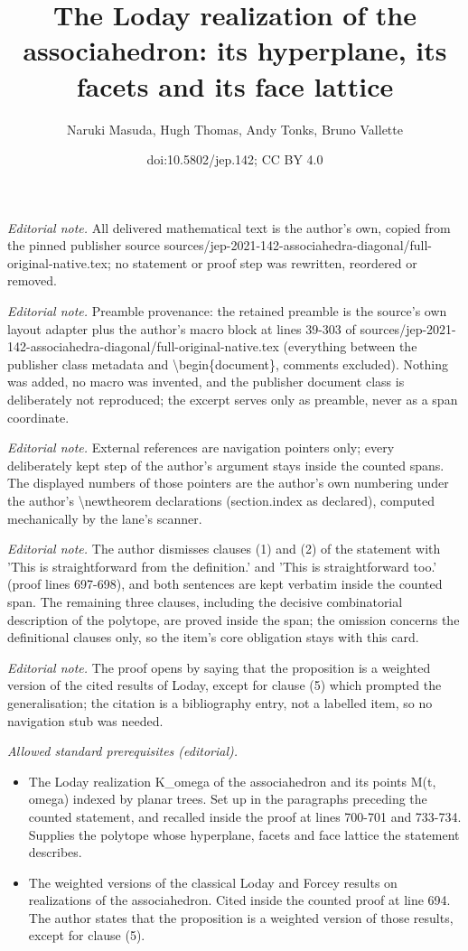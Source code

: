 \documentclass[10pt,a4paper]{amsart}
\title{The Loday realization of the associahedron: its hyperplane, its facets and its face lattice}
\author{Naruki Masuda, Hugh Thomas, Andy Tonks, Bruno Vallette}
\date{doi:10.5802/jep.142; CC BY 4.0}
\numberwithin{equation}{section}\providecommand{\No}{}
\theoremstyle{plain}
\theoremstyle{definition}
\begin{document}
\maketitle
\noindent\textit{Editorial note.} All delivered mathematical text is the author's own, copied from the pinned publisher source sources/jep-2021-142-associahedra-diagonal/full-original-native.tex; no statement or proof step was rewritten, reordered or removed.\par\medskip
\noindent\textit{Editorial note.} Preamble provenance: the retained preamble is the source's own layout adapter plus the author's macro block at lines 39-303 of sources/jep-2021-142-associahedra-diagonal/full-original-native.tex (everything between the publisher class metadata and \textbackslash{}begin\{document\}, comments excluded). Nothing was added, no macro was invented, and the publisher document class is deliberately not reproduced; the excerpt serves only as preamble, never as a span coordinate.\par\medskip
\noindent\textit{Editorial note.} External references are navigation pointers only; every deliberately kept step of the author's argument stays inside the counted spans. The displayed numbers of those pointers are the author's own numbering under the author's \textbackslash{}newtheorem declarations (section.index as declared), computed mechanically by the lane's scanner.\par\medskip
\noindent\textit{Editorial note.} The author dismisses clauses (1) and (2) of the statement with 'This is straightforward from the definition.' and 'This is straightforward too.' (proof lines 697-698), and both sentences are kept verbatim inside the counted span. The remaining three clauses, including the decisive combinatorial description of the polytope, are proved inside the span; the omission concerns the definitional clauses only, so the item's core obligation stays with this card.\par\medskip
\noindent\textit{Editorial note.} The proof opens by saying that the proposition is a weighted version of the cited results of Loday, except for clause (5) which prompted the generalisation; the citation is a bibliography entry, not a labelled item, so no navigation stub was needed.\par\medskip
\noindent\textit{Allowed standard prerequisites (editorial).}\begin{itemize}
\item The Loday realization K\_omega of the associahedron and its points M(t, omega) indexed by planar trees. Set up in the paragraphs preceding the counted statement, and recalled inside the proof at lines 700-701 and 733-734. Supplies the polytope whose hyperplane, facets and face lattice the statement describes.
\item The weighted versions of the classical Loday and Forcey results on realizations of the associahedron. Cited inside the counted proof at line 694. The author states that the proposition is a weighted version of those results, except for clause (5).
\end{itemize}\medskip
\end{document}
